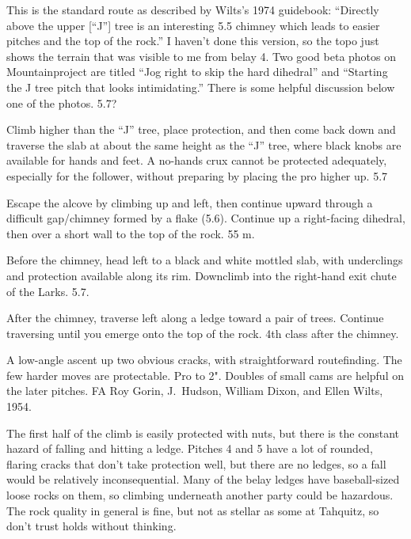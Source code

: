 \documentclass{tahquitz}
\begin{document}
 This is the standard route as described by Wilts's 1974 guidebook:
``Directly above the upper [``J''] tree is an interesting 5.5 chimney which leads
to easier pitches and the top of the rock.''
I haven't done this version, so the topo just shows the terrain that was visible
to me from belay 4. Two good beta
photos on Mountainproject are titled ``Jog right to skip the hard dihedral''
and ``Starting the J tree pitch that looks intimidating.''
There is some helpful discussion below one of the photos. 5.7?

 Climb higher than the ``J'' tree, place protection, and then come
back down and traverse the slab at about the same height as the ``J'' tree, where black
knobs are available for hands and feet. A no-hands crux cannot be protected adequately,
especially for the follower, without preparing by placing the pro higher up. 5.7

 Escape the alcove by climbing up and left, then continue upward through a
difficult gap/chimney formed by a flake (5.6). Continue up a right-facing dihedral, then
over a short wall to the top
of the rock. 55 m.

 Before the chimney, head left to a black and white mottled slab, with underclings
and protection available along its rim. Downclimb into the right-hand exit chute of the Larks. 5.7.

 After the chimney, traverse left along a ledge toward a pair of trees. Continue
traversing until you emerge onto the top of the rock. 4th class after the chimney.




A low-angle ascent up two obvious cracks, with straightforward
routefinding.  The few harder moves are protectable. Pro to 2".
Doubles of small cams are helpful on the later pitches.  FA Roy Gorin,
J.~Hudson, William Dixon, and Ellen Wilts, 1954.

The first half of the climb is easily protected with nuts, but there
is the constant hazard of falling and hitting a ledge. Pitches 4 and 5
have a lot of rounded, flaring cracks that don't take protection well,
but there are no ledges, so a fall would be relatively inconsequential.
Many of the belay ledges have baseball-sized loose rocks on them, so
climbing underneath another party could be hazardous. The rock quality
in general is fine, but not as stellar as some at Tahquitz, so don't
trust holds without thinking.
\end{document}

